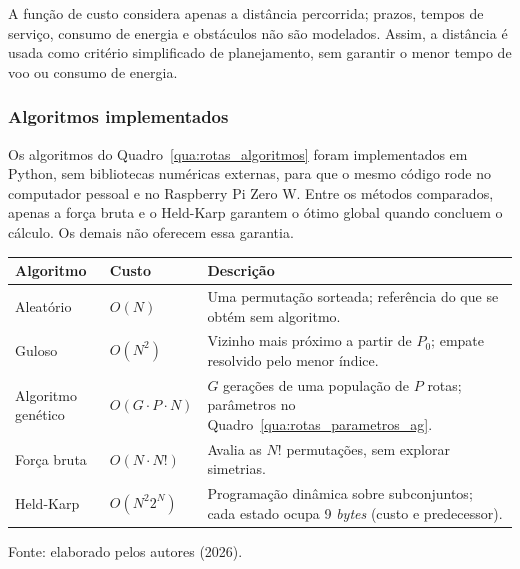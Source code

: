 A função de custo considera apenas a distância percorrida; prazos, tempos de serviço, consumo de energia e obstáculos não são modelados. Assim, a distância é usada como critério simplificado de planejamento, sem garantir o menor tempo de voo ou consumo de energia.

\subsubsection{Algoritmos implementados}\label{subsubsec:rotas_algoritmos}

Os algoritmos do Quadro~\ref{qua:rotas_algoritmos} foram implementados em Python, sem bibliotecas numéricas externas, para que o mesmo código rode no computador pessoal e no Raspberry Pi Zero W. Entre os métodos comparados, apenas a força bruta e o Held-Karp garantem o ótimo global quando concluem o cálculo. Os demais não oferecem essa garantia.

\begin{quadro}[H]
    \centering
    \caption{Algoritmos de ordem de visita comparados.}
    \label{qua:rotas_algoritmos}
    \small
    \renewcommand{\arraystretch}{1.3}
    \begin{tabular}{|>{\raggedright\arraybackslash}p{3.0cm}|>{\centering\arraybackslash}p{2.5cm}|>{\raggedright\arraybackslash}p{8.0cm}|}
        \hline
        \textbf{Algoritmo} & \textbf{Custo} & \textbf{Descrição} \\
        \hline
        Aleatório & $O(N)$ & Uma permutação sorteada; referência do que se obtém sem algoritmo. \\
        \hline
        Guloso & $O(N^2)$ & Vizinho mais próximo a partir de $P_0$; empate resolvido pelo menor índice. \\
        \hline
        Algoritmo genético & $O(G \cdot P \cdot N)$ & $G$ gerações de uma população de $P$ rotas; parâmetros no Quadro~\ref{qua:rotas_parametros_ag}. \\
        \hline
        Força bruta & $O(N \cdot N!)$ & Avalia as $N!$ permutações, sem explorar simetrias. \\
        \hline
        Held-Karp & $O(N^2 2^N)$ & Programação dinâmica sobre subconjuntos; cada estado ocupa 9 \textit{bytes} (custo e predecessor). \\
        \hline
    \end{tabular}
    \par\vspace{0.2cm}
    \footnotesize Fonte: elaborado pelos autores (2026).
\end{quadro}

